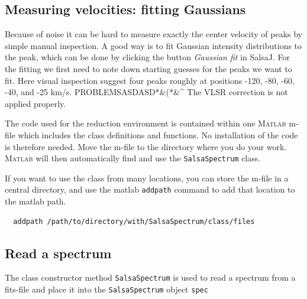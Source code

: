 \documentclass[11pt,a4paper]{article}
\begin{document}
\subsection{Measuring velocities: fitting Gaussians}
Because of noise it can be hard to measure exactly the center velocity
of peaks by simple manual inspection. A good way is to fit Gaussian
intensity distributions to the peak, which can be done by clicking the
button \emph{Gaussian fit} in SalsaJ. For the fitting we first need to
note down starting guesses for the peaks we want to fit. Here visual
inspection suggest four peaks roughly at positions -120, -80, -60, -40,
and -25 km/s. 
PROBLEMSASDASD*&(*&^
The VLSR correction is not applied properly.


\label{sec:installation}

The code used for the reduction environment is contained within one
\textsc{Matlab} m-file which includes the class definitions and functions. No
installation of the code is therefore needed. Move the m-file to the
directory where you do your work. \textsc{Matlab} will then automatically find
and use the \texttt{SalsaSpectrum} class.

If you want to use the class from many locations, you can store the
m-file in a central directory, and use the matlab \texttt{addpath}
command to add that location to the matlab path.

\begin{lstlisting}
  addpath /path/to/directory/with/SalsaSpectrum/class/files
\end{lstlisting}

\subsection{Read a spectrum}
\label{readaspectrum}

The class constructor method \texttt{SalsaSpectrum} is used to read a
spectrum from a fits-file and place it into the \texttt{SalsaSpectrum}
object \texttt{spec}
\end{document}
